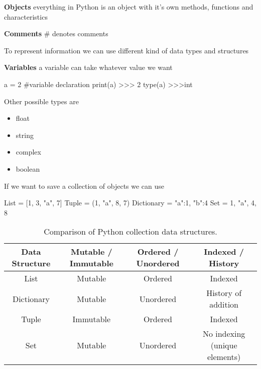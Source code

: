 \textbf{Objects} \ra everything in Python is an object with it's own methods, functions and characteristics

\vspace{10pt}

\textbf{Comments} \ra \# denotes comments

\vspace{10pt}

To represent information we can use different kind of data types and structures

\vspace{10pt}

\textbf{Variables} \ra a variable can take whatever value we want

\begin{pythoncode}
    a = 2 #variable declaration
    print(a)
>>> 2
    type(a)
>>>int
\end{pythoncode}

\vspace{10pt}

Other possible types are

\begin{itemize}
    \item float
    \item string
    \item complex
    \item boolean
\end{itemize}

\vspace{10pt}

If we want to save a collection of objects we can use

\begin{pythoncode}
    List = [1, 3, "a", 7]
    Tuple = (1, "a", 8, 7)
    Dictionary = {"a":1, "b":4}
    Set = {1, "a", 4, 8}
\end{pythoncode}

\begin{table}[h!]
\centering
\renewcommand{\arraystretch}{1.3}
\begin{tabular}{|c|c|c|c|}
\hline
\textbf{Data Structure} & \textbf{Mutable / Immutable} & \textbf{Ordered / Unordered} & \textbf{Indexed / History} \\
\hline
List        & Mutable   & Ordered   & Indexed \\
Dictionary  & Mutable   & Unordered & History of addition \\
Tuple       & Immutable & Ordered   & Indexed \\
Set         & Mutable   & Unordered & No indexing (unique elements) \\
\hline
\end{tabular}
\caption{Comparison of Python collection data structures.}
\end{table}

